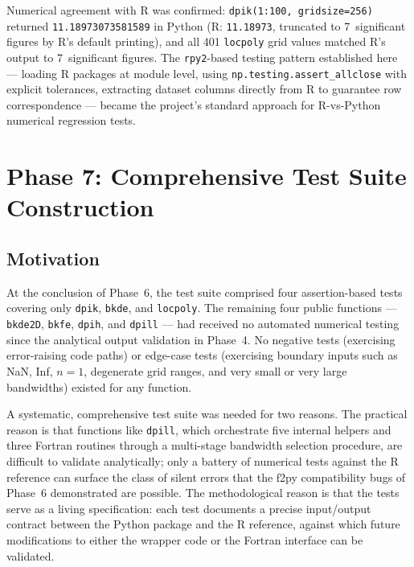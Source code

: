 \documentclass[12pt,a4paper]{article}
\begin{document}
Numerical agreement with R was confirmed: \texttt{dpik(1:100, gridsize=256)} returned \texttt{11.18973073581589} in Python (R: \texttt{11.18973}, truncated to 7~significant figures by R's default printing), and all 401 \texttt{locpoly} grid values matched R's output to 7~significant figures. The \texttt{rpy2}-based testing pattern established here --- loading R packages at module level, using \texttt{np.testing.assert\_allclose} with explicit tolerances, extracting dataset columns directly from R to guarantee row correspondence --- became the project's standard approach for R-vs-Python numerical regression tests.

\section{Phase 7: Comprehensive Test Suite Construction}

\subsection{Motivation}

At the conclusion of Phase~6, the test suite comprised four assertion-based tests covering only \texttt{dpik}, \texttt{bkde}, and \texttt{locpoly}. The remaining four public functions --- \texttt{bkde2D}, \texttt{bkfe}, \texttt{dpih}, and \texttt{dpill} --- had received no automated numerical testing since the analytical output validation in Phase~4. No negative tests (exercising error-raising code paths) or edge-case tests (exercising boundary inputs such as NaN, Inf, $n=1$, degenerate grid ranges, and very small or very large bandwidths) existed for any function.

A systematic, comprehensive test suite was needed for two reasons. The practical reason is that functions like \texttt{dpill}, which orchestrate five internal helpers and three Fortran routines through a multi-stage bandwidth selection procedure, are difficult to validate analytically; only a battery of numerical tests against the R reference can surface the class of silent errors that the f2py compatibility bugs of Phase~6 demonstrated are possible. The methodological reason is that the tests serve as a living specification: each test documents a precise input/output contract between the Python package and the R reference, against which future modifications to either the wrapper code or the Fortran interface can be validated.
\end{document}
